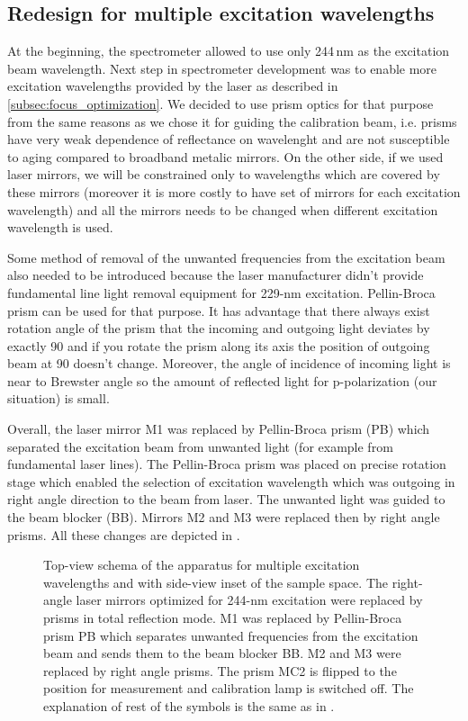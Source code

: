 \subsection{Redesign for multiple excitation wavelengths}

At the beginning, the spectrometer allowed to use only 244\,nm as the
excitation beam wavelength. Next step in spectrometer development was to
enable more excitation wavelengths provided by the laser as described in
\cref{subsec:focus_optimization}.
We decided to use prism optics for that purpose from the same reasons as we
chose it for guiding the calibration beam, i.e. prisms have very weak
dependence of reflectance on wavelenght and are not susceptible to aging
compared to broadband metalic mirrors. On the other side, if we used laser
mirrors, we will be constrained only to wavelengths which are covered by
these mirrors (moreover it is more costly to have set of mirrors for each
excitation wavelength) and all the mirrors needs to be changed when different
excitation wavelength is used.

Some method of removal of the unwanted frequencies from the excitation beam
also needed to be introduced because the laser manufacturer didn't provide
fundamental line light removal equipment for 229-nm excitation. Pellin-Broca
prism can be used for that purpose. It has advantage that there always exist
rotation angle of the prism that the incoming and outgoing light deviates by
exactly 90\textdegree{} and if you rotate the prism along its axis the position
of outgoing beam at 90\textdegree{} doesn't change. Moreover, the angle of
incidence of incoming light is near to Brewster angle so the amount of
reflected light for p-polarization (our situation) is small.

Overall, the laser mirror M1 was replaced by Pellin-Broca prism (PB) which
separated the excitation beam from unwanted light (for example from fundamental
laser lines). The Pellin-Broca prism was placed on precise rotation stage
which enabled the selection of excitation wavelength which was outgoing in
right angle direction to the beam from laser. The unwanted light was guided to
the beam blocker (BB). Mirrors M2 and M3 were replaced then by right angle
prisms. All these changes are depicted in
.

\begin{figure}
	\centering
	
	\caption{Top-view schema of the apparatus for multiple excitation wavelengths
		and with side-view inset of the sample space. The right-angle laser
		mirrors optimized for 244-nm excitation were replaced by prisms in total
		reflection mode. M1 was replaced by Pellin-Broca prism PB which separates
		unwanted frequencies from the excitation beam and sends them to the beam
		blocker BB. M2 and M3 were replaced by right angle prisms. The prism MC2 is
		flipped to the position for measurement and calibration lamp is switched
		off. The explanation of rest of the symbols is the same as in
		.}
	\label{\figlabel{multiple_excitations:apparatus_schema}}
\end{figure}

